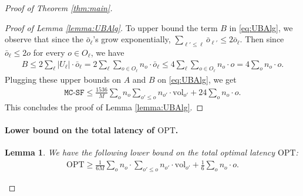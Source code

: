 \documentclass[11pt, a4paper]{article}
\theoremstyle{plain}
\newtheorem{lemma}[theorem]{Lemma}
\theoremstyle{definition}
\theoremstyle{remark}
\newcommand{\OPT}{\text{OPT}}
\newcommand{\mcsdf}{\texttt{MC-SF}}
\newcommand{\vol}{\textrm{vol}}
\newcommand{\alg}{\mcsdf}
\begin{document}
\begin{proof}[Proof of Theorem \ref{thm:main}]
\begin{proof}[Proof of Lemma \ref{lemma:UBAlg}]
	To upper bound the term $B$ in \eqref{eq:UBAlg}, we observe that since the $\bar{o}_\ell$'s grow exponentially, $\sum_{\ell' \le \ell} \bar{o}_{\ell'} \le 2 \bar{o}_{\ell}.$ Then since $\bar{o}_{\ell} \le 2 o$ for every $o \in O_{\ell}$, we have
	\begin{align*}
		B \le 2 \sum_\ell |U_\ell| \cdot \bar{o}_{\ell} = 2 \sum_\ell \sum_{o \in O_\ell} n_o \cdot \bar{o}_{\ell} \le  4 \sum_\ell \sum_{o \in O_\ell} n_o \cdot o = 4 \sum_o n_o \cdot o.
	\end{align*}
	Plugging these upper bounds on $A$ and $B$ on \eqref{eq:UBAlg}, we get
	\begin{align*}
		\alg \le \frac{1536}{M} \sum_o n_o \sum_{o' \le o} n_{o'} \cdot  \vol_{o'} + 24 \sum_o n_o \cdot o.
	\end{align*}
	This concludes the proof of Lemma \ref{lemma:UBAlg}.
\end{proof}


\paragraph{Lower bound on the total latency of $\OPT$.} 

\begin{lemma} \label{lemma:LBOPT}
	We have the following lower bound on the total optimal latency $\OPT$:
	\begin{align*}
		\OPT \ge \frac{1}{6M} \sum_o n_o \cdot \sum_{o' \le o} n_{o'} \cdot \vol_{o'} + \frac{1}{6} \sum_o n_o \cdot o.
	\end{align*}
\end{lemma}




\end{proof}
\end{document}
